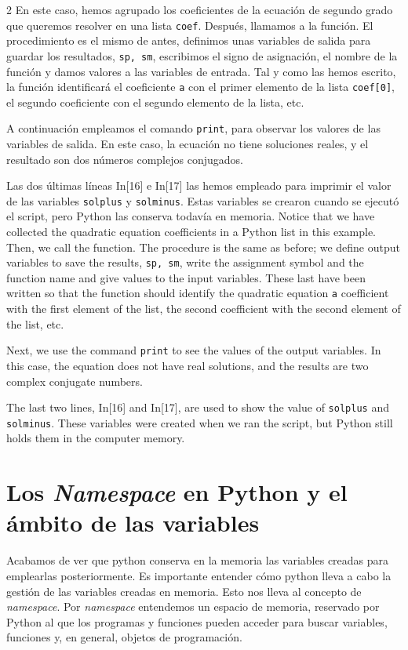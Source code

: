 \begin{paracol}{2}
En este caso, hemos agrupado los coeficientes de la ecuación de segundo grado que queremos resolver en una lista \texttt{coef}. Después, llamamos a la función. El procedimiento es el mismo de antes, definimos unas variables de salida para guardar los resultados, \texttt{sp, sm}, escribimos el signo de asignación, el nombre de la función y damos valores a las variables de entrada. Tal y como las hemos escrito, la función identificará el coeficiente \texttt{a} con el primer elemento de la lista \texttt{coef[0]}, el segundo coeficiente con el segundo elemento de la lista, etc.

A continuación empleamos el comando \texttt{print}, para observar los valores de las variables de salida. En este caso, la ecuación no tiene soluciones reales, y el resultado son dos números complejos conjugados.

Las dos últimas líneas In[16] e In[17] las hemos empleado para imprimir el valor de las variables \texttt{solplus} y \texttt{solminus}. Estas variables se crearon cuando se ejecutó el script, pero Python las conserva todavía en memoria.
\switchcolumn
Notice that we have collected the quadratic equation coefficients in a Python list in this example. Then, we call the function. The procedure is the same as before; we define output variables to save the results, \texttt{sp, sm}, write the assignment symbol and the function name and give values to the input variables. These last have been written so that the function should identify the quadratic equation \texttt{a} coefficient with the first element of the list, the second coefficient with the second element of the list, etc. 

Next, we use the command \texttt{print} to see the values of the output variables. In this case, the equation does not have real solutions, and the results are two complex conjugate numbers.

The last two lines, In[16] and In[17], are used to show the value of \texttt{solplus} and \texttt{solminus}. These variables were created when we ran the script, but Python still holds them in the computer memory. 
\switchcolumn
\section{Los \emph{Namespace} en Py\-thon y el ámbito de las variables} 
Acabamos de ver que python conserva en la memoria las variables creadas para emplearlas posteriormente. Es importante entender cómo python lleva a cabo la gestión de las variables creadas en memoria. Esto nos lleva al concepto de \emph{namespace}.
Por \emph{namespace} entendemos un espacio de memoria, reservado por Python al que los programas y funciones pueden acceder para buscar variables, funciones y, en general, objetos de programación.


\end{paracol}
